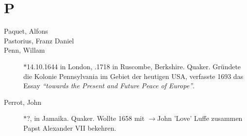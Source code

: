 \section*{P}

\articlesize

\begin{description}

 \item[Paquet, Alfons]

 \item[Pastorius, Franz Daniel]

 \item[Penn, Willam] $\ast$14.10.1644 in London, .1718 in Ruscombe,
 Berkshire. Quaker. Gründete die Kolonie Pennsylvania im Gebiet der heutigen
 USA, verfasste 1693 das Essay \textit{"`towards the Present and Future Peace
 of Europe"'}.

 \item[Perrot, John] $\ast$?,  in Jamaika. Quaker. Wollte 1658 mit
 $\to$John 'Love' Luffe zusammen Papst Alexander VII bekehren.


 \end{description}
\normalsize


